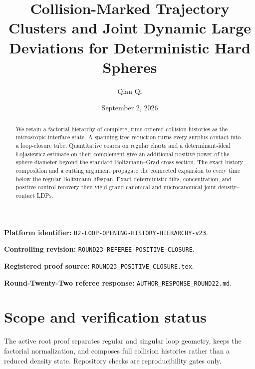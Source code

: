 \documentclass[11pt,reqno]{amsart}
\title[Collision-marked clusters and dynamic LDP]{Collision-Marked Trajectory Clusters and Joint Dynamic Large Deviations for Deterministic Hard Spheres}
\author{Qian Qi}
\date{September 2, 2026}
\theoremstyle{definition}
\theoremstyle{remark}
\begin{document}
\raggedbottom
\begin{abstract}
We retain a factorial hierarchy of complete, time-ordered collision histories
as the microscopic interface state.  A spanning-tree reduction turns every
surplus contact into a loop-closure tube.  Quantitative coarea on regular
charts and a determinant-ideal Łojasiewicz estimate on their complement give
an additional positive power of the sphere diameter beyond the standard
Boltzmann--Grad cross-section.  The exact history composition and a cutting
argument propagate the connected expansion to every time below the regular
Boltzmann lifespan.  Exact deterministic tilts, concentration, and positive
control recovery then yield grand-canonical and microcanonical joint
density--contact LDPs.
\end{abstract}
\maketitle
\noindent\textbf{Platform identifier:} \texttt{B2-LOOP-OPENING-HISTORY-HIERARCHY-v23}.\par
\noindent\textbf{Controlling revision:} \texttt{ROUND23-REFEREE-POSITIVE-CLOSURE}.\par
\noindent\textbf{Registered proof source:} \texttt{ROUND23\_POSITIVE\_CLOSURE.tex}.\par
\noindent\textbf{Round-Twenty-Two referee response:} \texttt{AUTHOR\_RESPONSE\_ROUND22.md}.\par
\tableofcontents

\section*{Scope and verification status}
The active root proof separates regular and singular loop geometry, keeps the
factorial normalization, and composes full collision histories rather than a
reduced density state. Repository checks are reproducibility gates only.
\printbibliography
\end{document}
